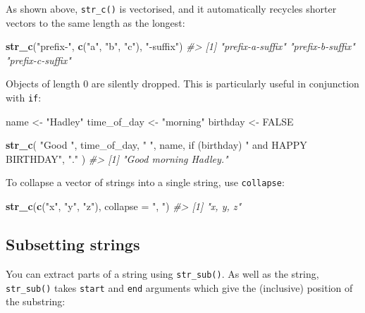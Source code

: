 \documentclass[]{book}
\newenvironment{Shaded}{\begin{snugshade}}{\end{snugshade}}
\newcommand{\KeywordTok}[1]{\textcolor[rgb]{0.13,0.29,0.53}{\textbf{{#1}}}}
\newcommand{\DataTypeTok}[1]{\textcolor[rgb]{0.13,0.29,0.53}{{#1}}}
\newcommand{\StringTok}[1]{\textcolor[rgb]{0.31,0.60,0.02}{{#1}}}
\newcommand{\CommentTok}[1]{\textcolor[rgb]{0.56,0.35,0.01}{\textit{{#1}}}}
\newcommand{\OtherTok}[1]{\textcolor[rgb]{0.56,0.35,0.01}{{#1}}}
\newcommand{\NormalTok}[1]{{#1}}
\begin{document}
As shown above, \texttt{str\_c()} is vectorised, and it automatically
recycles shorter vectors to the same length as the longest:

\begin{Shaded}
\begin{Highlighting}[]
\KeywordTok{str_c}\NormalTok{(}\StringTok{"prefix-"}\NormalTok{, }\KeywordTok{c}\NormalTok{(}\StringTok{"a"}\NormalTok{, }\StringTok{"b"}\NormalTok{, }\StringTok{"c"}\NormalTok{), }\StringTok{"-suffix"}\NormalTok{)}
\CommentTok{#> [1] "prefix-a-suffix" "prefix-b-suffix" "prefix-c-suffix"}
\end{Highlighting}
\end{Shaded}

Objects of length 0 are silently dropped. This is particularly useful in
conjunction with \texttt{if}:

\begin{Shaded}
\begin{Highlighting}[]
\NormalTok{name <-}\StringTok{ "Hadley"}
\NormalTok{time_of_day <-}\StringTok{ "morning"}
\NormalTok{birthday <-}\StringTok{ }\OtherTok{FALSE}

\KeywordTok{str_c}\NormalTok{(}
  \StringTok{"Good "}\NormalTok{, time_of_day, }\StringTok{" "}\NormalTok{, name,}
  \NormalTok{if (birthday) }\StringTok{" and HAPPY BIRTHDAY"}\NormalTok{,}
  \StringTok{"."}
\NormalTok{)}
\CommentTok{#> [1] "Good morning Hadley."}
\end{Highlighting}
\end{Shaded}

To collapse a vector of strings into a single string, use
\texttt{collapse}:

\begin{Shaded}
\begin{Highlighting}[]
\KeywordTok{str_c}\NormalTok{(}\KeywordTok{c}\NormalTok{(}\StringTok{"x"}\NormalTok{, }\StringTok{"y"}\NormalTok{, }\StringTok{"z"}\NormalTok{), }\DataTypeTok{collapse =} \StringTok{", "}\NormalTok{)}
\CommentTok{#> [1] "x, y, z"}
\end{Highlighting}
\end{Shaded}

\subsection{Subsetting strings}\label{subsetting-strings}

You can extract parts of a string using \texttt{str\_sub()}. As well as
the string, \texttt{str\_sub()} takes \texttt{start} and \texttt{end}
arguments which give the (inclusive) position of the substring:
\end{document}

